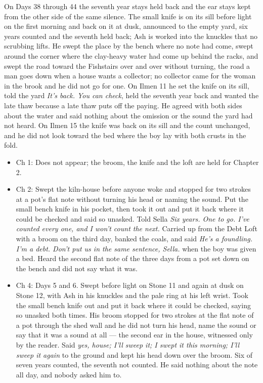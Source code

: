 \documentclass{design/chronicle}
\begin{document}
{On Days 38 through 44 the seventh year stays held back and the ear stays kept from the other side of the same silence. The small knife is on its sill before light on the first morning and back on it at dusk, announced to the empty yard, six years counted and the seventh held back; Ash is worked into the knuckles that no scrubbing lifts. He swept the place by the bench where no note had come, swept around the corner where the clay-heavy water had come up behind the racks, and swept the road toward the Fishstairs over and over without turning, the road a man goes down when a house wants a collector; no collector came for the woman in the brook and he did not go for one. On Ilmen 11 he set the knife on its sill, told the yard \emph{It’s back. You can check}, held the seventh year back and wanted the late thaw because a late thaw puts off the paying. He agreed with both sides about the water and said nothing about the omission or the sound the yard had not heard. On Ilmen 15 the knife was back on its sill and the count unchanged, and he did not look toward the bed where the boy lay with both crusts in the fold.

\begin{itemize}[leftmargin=1.4em,itemsep=1pt,topsep=3pt,parsep=0pt]

\item Ch 1: Does not appear; the broom, the knife and the loft are held for Chapter 2.

\item Ch 2: Swept the kiln-house before anyone woke and stopped for two strokes at a pot’s flat note without turning his head or naming the sound. Put the small bench knife in his pocket, then took it out and put it back where it could be checked and said so unasked. Told Sella \emph{Six years. One to go. I’ve counted every one, and I won’t count the next.} Carried up from the Debt Loft with a broom on the third day, banked the coals, and said \emph{He’s a foundling. I’m a debt. Don’t put us in the same sentence, Sella.} when the boy was given a bed. Heard the second flat note of the three days from a pot set down on the bench and did not say what it was.

\end{itemize}

\begin{itemize}[leftmargin=1.4em,itemsep=1pt,topsep=3pt,parsep=0pt]

\item Ch 4: Days 5 and 6. Swept before light on Stone 11 and again at dusk on Stone 12, with Ash in his knuckles and the pale ring at his left wrist. Took the small bench knife out and put it back where it could be checked, saying so unasked both times. His broom stopped for two strokes at the flat note of a pot through the shed wall and he did not turn his head, name the sound or say that it was a sound at all --- the second ear in the house, witnessed only by the reader. Said \emph{yes, house; I’ll sweep it; I swept it this morning; I’ll sweep it again} to the ground and kept his head down over the broom. Six of seven years counted, the seventh not counted. He said nothing about the note all day, and nobody asked him to.


\end{itemize}}
\end{document}

